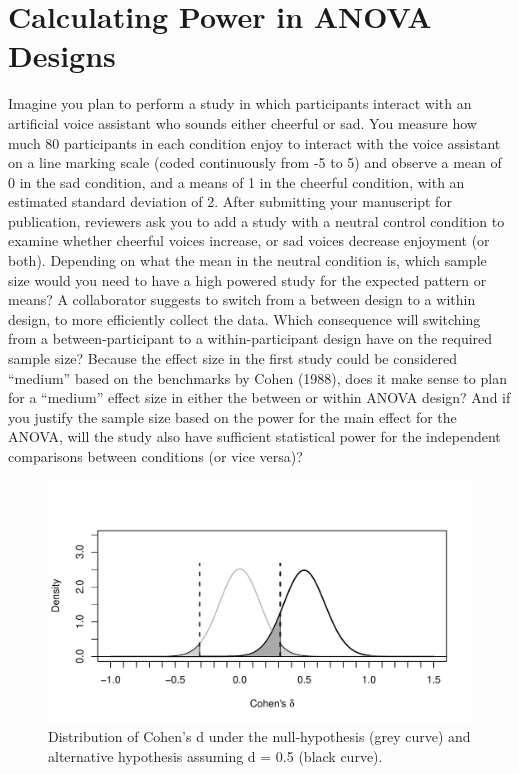 \documentclass[,jou, draftfirst, a4paper,floatsintext]{apa6}
\begin{document}
\hypertarget{calculating-power-in-anova-designs}{%
\section{Calculating Power in ANOVA Designs}\label{calculating-power-in-anova-designs}}

Imagine you plan to perform a study in which participants interact with an artificial voice assistant who sounds either cheerful or sad.
You measure how much 80 participants in each condition enjoy to interact with the voice assistant on a line marking scale (coded continuously from -5 to 5) and observe a mean of 0 in the sad condition, and a means of 1 in the cheerful condition, with an estimated standard deviation of 2.
After submitting your manuscript for publication, reviewers ask you to add a study with a neutral control condition to examine whether cheerful voices increase, or sad voices decrease enjoyment (or both).
Depending on what the mean in the neutral condition is, which sample size would you need to have a high powered study for the expected pattern or means?
A collaborator suggests to switch from a between design to a within design, to more efficiently collect the data.
Which consequence will switching from a between-participant to a within-participant design have on the required sample size?
Because the effect size in the first study could be considered \enquote{medium} based on the benchmarks by Cohen (1988), does it make sense to plan for a \enquote{medium} effect size in either the between or within ANOVA design?
And if you justify the sample size based on the power for the main effect for the ANOVA, will the study also have sufficient statistical power for the independent comparisons between conditions (or vice versa)?

\begin{figure}
\centering
\includegraphics{0.1_Simulation_Based_Power_Analysis_For_Factorial_ANOVA_Designs_files/figure-latex/d-plot-1.pdf}
\caption{\label{fig:d-plot}Distribution of Cohen's d under the null-hypothesis (grey curve) and alternative hypothesis assuming d = 0.5 (black curve).}
\end{figure}
\end{document}
